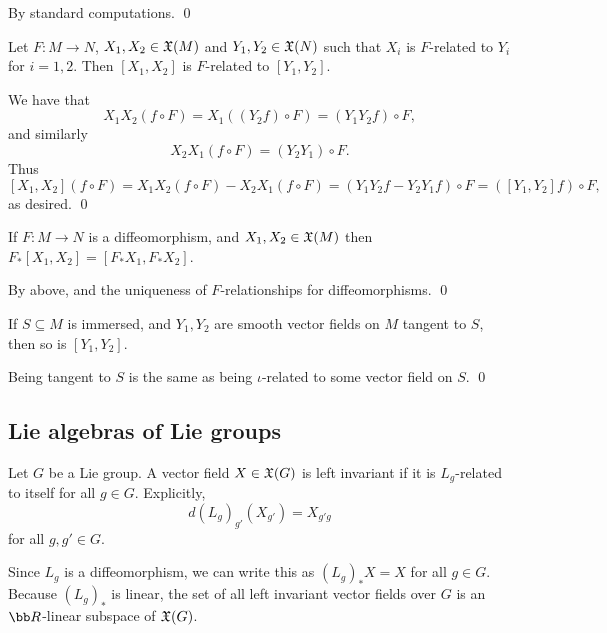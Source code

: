 \eprop

\bproof

    By standard computations.
    \qed

\eproof

\bprop

    Let $F\colon M\to N$, $X_1,X_2\in{\frak X}(M)$ and $Y_1,Y_2\in{\frak X}(N)$ such that $X_i$ is $F$-related to $Y_i$ for $i=1,2$.
    Then $[X_1,X_2]$ is $F$-related to $[Y_1,Y_2]$.

\eprop

\bproof

    We have that
    $$ X_1X_2(f\circ F) = X_1((Y_2f)\circ F) = (Y_1Y_2f)\circ F , $$
    and similarly
    $$ X_2X_1(f\circ F) = (Y_2Y_1)\circ F . $$
    Thus
    $$ [X_1,X_2](f\circ F) = X_1X_2(f\circ F) - X_2X_1(f\circ F) = (Y_1Y_2f-Y_2Y_1f)\circ F = ([Y_1,Y_2]f)\circ F , $$
    as desired.
    \qed

\eproof

\bcoro

    If $F\colon M\to N$ is a diffeomorphism, and $X_1,X_2\in{\frak X}(M)$ then $F_*[X_1,X_2]=[F_*X_1,F_*X_2]$.

\ecoro

\bproof

    By above, and the uniqueness of $F$-relationships for diffeomorphisms.
    \qed

\eproof

\bcoro

    If $S\subseteq M$ is immersed, and $Y_1,Y_2$ are smooth vector fields on $M$ tangent to $S$, then so is $[Y_1,Y_2]$.

\ecoro

\bproof

    Being tangent to $S$ is the same as being $\iota$-related to some vector field on $S$.
    \qed

\eproof

\subsection{Lie algebras of Lie groups}

\bdefn

    Let $G$ be a Lie group.
    A vector field $X\in{\frak X}(G)$ is {\emphcolor left invariant} if it is $L_g$-related to itself for all $g\in G$.
    Explicitly,
    $$ d(L_g)_{g'}(X_{g'}) = X_{g'g} $$
    for all $g,g'\in G$.

\edefn

Since $L_g$ is a diffeomorphism, we can write this as $(L_g)_*X=X$ for all $g\in G$.
Because $(L_g)_*$ is linear, the set of all left invariant vector fields over $G$ is an $\bR$-linear subspace of ${\frak X}(G)$.

